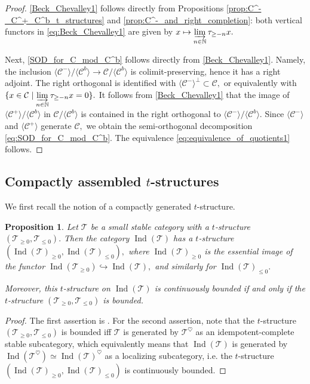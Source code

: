\documentclass[11pt,leqno]{amsart}
\newtheorem{prop}[theo]{Proposition}
\numberwithin{equation}{section}
\def\N{\mathbb{N}}
\newcommand{\indlim}[1][]{\mathop{\varinjlim}\limits_{#1}}
\newcommand{\hto}{\hookrightarrow}
\newcommand{\cC}{{\mathcal C}}
\newcommand{\cT}{{\mathcal T}}
\newcommand{\la}{\langle}
\newcommand{\ra}{\rangle}
\newcommand{\Ind}{\operatorname{Ind}}
\begin{document}
\begin{proof}
\ref{Beck_Chevalley1} follows directly from Propositions \ref{prop:C^-_C^+_C^b_t_structures} and \ref{prop:C^-_and_right_completion}: both vertical functors in \eqref{eq:Beck_Chevalley1} are given by $x\mapsto\indlim[n\in\N]\tau_{\geq -n}x.$

Next, \ref{SOD_for_C_mod_C^b} follows directly from \ref{Beck_Chevalley1}. Namely, the inclusion $\la\cC^-\ra/\la\cC^b\ra\to\cC/\la\cC^b\ra$ is colimit-preserving, hence it has a right adjoint. The right orthogonal is identified with $\la\cC^-\ra^{\perp}\subset\cC,$ or equivalently with $\{x\in \cC\mid \indlim[n\in\N]\tau_{\geq -n}x = 0\}.$ It follows from \ref{Beck_Chevalley1} that the image of $\la\cC^+\ra/\la\cC^b\ra$ in $\cC/\la\cC^b\ra$ is contained in the right orthogonal to $\la\cC^-\ra/\la\cC^b\ra.$ Since $\la\cC^-\ra$ and $\la\cC^+\ra$ generate $\cC,$ we obtain the semi-orthogonal decomposition \eqref{eq:SOD_for_C_mod_C^b}. The equivalence \eqref{eq:equivalence_of_quotients1} follows.
\end{proof}

\subsection{Compactly assembled $t$-structures}

We first recall the notion of a compactly generated $t$-structure.

\begin{prop}\label{prop:compactly_generated_t_structure}
Let $\cT$ be a small stable category with a $t$-structure $(\cT_{\geq 0},\cT_{\leq 0}).$ Then the category $\Ind(\cT)$ has a $t$-structure $(\Ind(\cT)_{\geq 0},\Ind(\cT)_{\leq 0}),$ where $\Ind(\cT)_{\geq 0}$ is the essential image of the functor $\Ind(\cT_{\geq 0})\hto\Ind(\cT),$ and similarly for $\Ind(\cT)_{\leq 0}.$

Moreover, this $t$-structure on $\Ind(\cT)$ is continuously bounded if and only if the $t$-structure $(\cT_{\geq 0},\cT_{\leq 0})$ is bounded.
\end{prop}

\begin{proof}
The first assertion is \cite[Lemma C.2.4.3]{Lur18}. For the second assertion, note that the $t$-structure $(\cT_{\geq 0},\cT_{\leq 0})$ is bounded iff $\cT$ is generated by $\cT^{\heartsuit}$ as an idempotent-complete stable subcategory, which equivalently means that $\Ind(\cT)$ is generated by $\Ind(\cT^{\heartsuit})\simeq \Ind(\cT)^{\heartsuit}$ as a localizing subcategory, i.e. the $t$-structure $(\Ind(\cT)_{\geq 0},\Ind(\cT)_{\leq 0})$ is continuously bounded. 
\end{proof}
\end{document}
